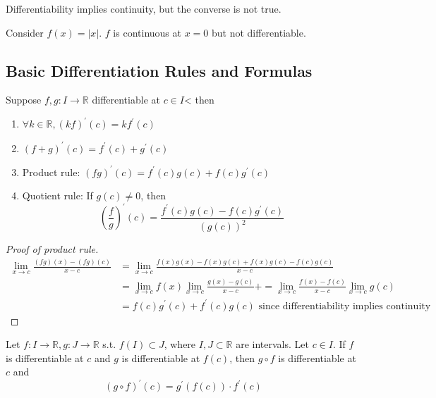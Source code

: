 \begin{remark}
    Differentiability implies continuity, but the converse is not
    true.
\end{remark}

\begin{example}
    Consider $f(x) = |x|$. $f$ is continuous at $x=0$
    but not differentiable.
\end{example}

\subsection{Basic Differentiation Rules and Formulas}

\begin{theorem}
    Suppose $f, g: I \to \mathbb{R}$ differentiable at $c \in I$<
    then 
    \begin{enumerate}
        \item $\forall k \in \mathbb{R}, (kf)^{\prime}(c) = k f^{\prime}(c)$
        \item $( f+ g)^{\prime}(c) = f^{\prime}(c) + g^{\prime}(c)$
        \item Product rule: $(fg)^{\prime}(c) = f^{\prime}(c) g(c) + f(c) g^{\prime}(c)$
        \item Quotient rule: If $g(c) \neq 0$, then 
        \[
            \left( \frac{f}{g} \right)^{\prime}(c) = 
            \frac{f^{\prime}(c) g(c) - f(c) g^{\prime}(c)}{ \left( g(c) \right)^2 }
        \]
    \end{enumerate} 
\end{theorem}

\begin{proof}[Proof of product rule]
    \begin{align*}
        \lim_{x \to c} \frac{(fg)(x) - (fg)(c)}{x-c}
        &=
        \lim_{x \to c} \frac{f(x) g(x) - f(x)g(c) + f(x)g(c) - f(c)g(c)}{x-c} \\
        &= \lim_{x \to c} f(x) \lim_{x \to c} \frac{g(x) - g(c)}{x - c} + 
        = \lim_{x \to c} \frac{f(x) - f(c)}{x-c}\lim_{x \to c} g(c)  \\
        &= f(c) g^{\prime}(c) + f^{\prime}(c) g(c) 
        \text{ since differentiability implies continuity}
    \end{align*}
\end{proof}

\begin{theorem}
    Let $f: I \to \mathbb{R}, g: J \to \mathbb{R}$ s.t. 
    $f(I) \subset J$, where $I, J \subset \mathbb{R}$ are intervals. 
    Let $c \in I$. If $f$ is differentiable at $c$
    and $g$ is differentiable at $f(c)$, then 
    $g \circ f$ is differentiable at $c$ and 
    \[
        (g \circ f)^{\prime}(c) = g^{\prime}(f(c)) \cdot f^{\prime}(c)
    \]
\end{theorem}

